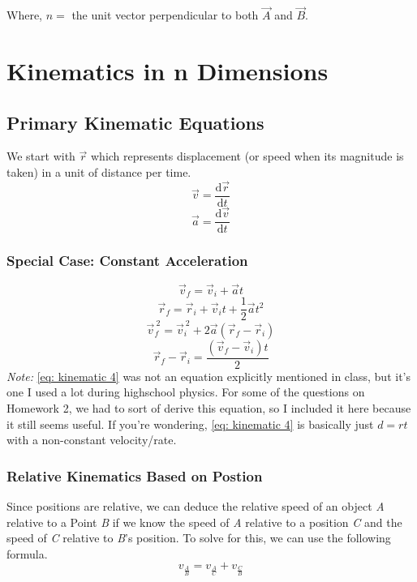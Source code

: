 \documentclass{article}
\begin{document}
Where, $n = $ the unit vector perpendicular to both $\vec{A}$ and $\vec{B}$.



\newpage \section{Kinematics in n Dimensions}
\subsection{Primary Kinematic Equations}
We start with $\vec{r}$ which represents displacement (or speed when its magnitude is taken) in a unit of distance per time.
\begin{equation}
    \vec{v} = \frac{\mathrm{d}\vec{r}}{\mathrm{d}t}
\end{equation}
\begin{equation}
    \vec{a} = \frac{\mathrm{d}\vec{v}}{\mathrm{d}t}
    \end{equation}
    \subsubsection{Special Case: Constant Acceleration} \label{kinematics const a}
    \begin{equation}\label{eq: kinematic 1}
    \vec{v}_f = \vec{v}_i + \vec{a}t
\end{equation}
\begin{equation}\label{eq: kinematic 2}
    \vec{r}_f = \vec{r}_i + \vec{v}_it+ \frac{1}{2}\vec{a}t^2 
\end{equation}
\begin{equation}\label{eq: kinematic 3}
    \vec{v}_f^{ \: 2} = \vec{v}_i^{ \: 2} + 2 \vec{a} (\vec{r}_f - \vec{r}_i)
\end{equation}
\begin{equation}\label{eq: kinematic 4}
    \vec{r}_f - \vec{r}_i = \frac{(\vec{v}_f - \vec{v}_i)t}{2}
\end{equation}
\textit{Note:} \ref{eq: kinematic 4} was not an equation explicitly mentioned in class, but it's one I used a lot during highschool physics. For some of the questions on Homework 2, we had to sort of derive this equation, so I included it here because it still seems useful. If you're wondering, \ref{eq: kinematic 4} is basically just $d = rt$ with a non-constant velocity/rate.
\subsubsection{Relative Kinematics Based on Postion}
Since positions are relative, we can deduce the relative speed of an object \textit{A} relative to a Point \textit{B} if we know the speed of \textit{A} relative to a position \textit{C} and the speed of \textit{C} relative to \textit{B}'s position. To solve for this, we can use the following formula.
\begin{equation}
    v_{\frac{A}{B}} = v_{\frac{A}{C}} +  v_{\frac{C}{B}}
\end{equation}
\end{document}
